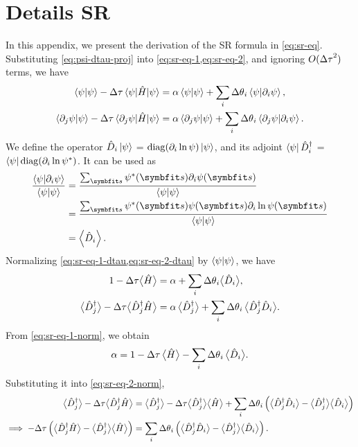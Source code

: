\chapter{Details  SR }
\label{append:sr}

In this appendix, we present the derivation of the SR formula in \cref{eq:sr-eq}. Substituting \cref{eq:psi-dtau-proj} into \cref{eq:sr-eq-1,eq:sr-eq-2}, and ignoring $O({\Delta \tau}^2)$ terms, we have
\begin{align}
\ip{\psi} - \dta \ev{\hat{H}}{\psi} &= \alpha \ip{\psi} + \sum_i \dth_i \ip{\psi}{\pp_i \psi}, \label{eq:sr-eq-1-dtau} \\
\ip{\pp_j \psi}{\psi} - \dta \mel{\pp_j \psi}{\hat{H}}{\psi} &= \alpha \ip{\pp_j \psi}{\psi} + \sum_i \dth_i \ip{\pp_j \psi}{\pp_i \psi}. \label{eq:sr-eq-2-dtau}
\end{align}
We define the operator $\hat{D}_i \ket{\psi}$ = $\mathrm{diag}(\partial_i \ln \psi) \ket{\psi}$, and its adjoint $\bra{\psi} \hat{D}^\dagger_i$ = $\bra{\psi} \mathrm{diag}(\partial_i \ln \psi^*)$. It can be used as
\begin{align}
\fpsps{\ip{\psi}{\pp_i \psi}}
&= \fpsps{\sum_\vs \psi^*(\vs) \pp_i \psi(\vs)} \\
&= \fpsps{\sum_\vs \psi^*(\vs) \psi(\vs) \pp_i \ln \psi(\vs)} \\
&= \ev{\hat{D}_i}.
\end{align}
Normalizing \cref{eq:sr-eq-1-dtau,eq:sr-eq-2-dtau} by $\ip{\psi}$, we have
\begin{align}
1 - {\Delta \tau} \big\langle \hat{H} \big\rangle &= \alpha + \sum_i {\Delta \theta}_i \big\langle \hat{D}_i \big\rangle, \label{eq:sr-eq-1-norm} \\
\big\langle \hat{D}^\dagger_j \big\rangle - {\Delta \tau} \big\langle \hat{D}^\dagger_j \hat{H} \big\rangle &= \alpha\,\big\langle \hat{D}^\dagger_j \big\rangle + \sum_i {\Delta \theta}_i\,\big\langle \hat{D}^\dagger_j \hat{D}_i \big\rangle. \label{eq:sr-eq-2-norm}
\end{align}
From \cref{eq:sr-eq-1-norm}, we obtain
\begin{equation}
\alpha = 1 - {\Delta \tau}\,\big\langle \hat{H} \big\rangle - \sum_i {\Delta \theta}_i\,\big\langle \hat{D}_i \big\rangle.
\end{equation}
Substituting it into \cref{eq:sr-eq-2-norm},
\begin{align}
\big\langle \hat{D}^\dagger_j \big\rangle - {\Delta \tau} \big\langle \hat{D}^\dagger_j \hat{H} \big\rangle
&= \big\langle \hat{D}^\dagger_j \big\rangle
- {\Delta \tau} \big\langle \hat{D}^\dagger_j \big\rangle \big\langle \hat{H} \big\rangle
+ \sum_i {\Delta \theta}_i \left( \big\langle \hat{D}^\dagger_j \hat{D}_i \big\rangle - \big\langle \hat{D}^\dagger_j \big\rangle \big\langle \hat{D}_i \big\rangle \right) \\
\implies
-{\Delta \tau} \left( \big\langle \hat{D}^\dagger_j \hat{H} \big\rangle - \big\langle \hat{D}^\dagger_j \big\rangle \big\langle \hat{H} \big\rangle \right)
&= \sum_i {\Delta \theta}_i \left( \big\langle \hat{D}^\dagger_j \hat{D}_i \big\rangle - \big\langle \hat{D}^\dagger_j \big\rangle \big\langle \hat{D}_i \big\rangle \right).
\end{align}
